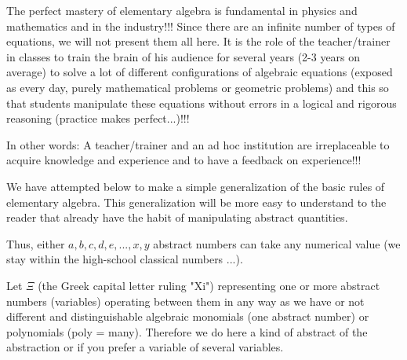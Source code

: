 	The perfect mastery of elementary algebra is fundamental in physics and mathematics and in the industry!!! Since there are an infinite number of types of equations, we will not present them all here. It is the role of the teacher/trainer in classes to train the brain of his audience for several years (2-3 years on average) to solve a lot of different configurations of algebraic equations (exposed as every day, purely mathematical problems or geometric problems) and this so that students manipulate these equations without errors in a logical and rigorous reasoning (practice makes perfect...)!!!

	In other words: A teacher/trainer and an ad hoc institution are irreplaceable to acquire knowledge and experience and to have a feedback on experience!!!

	\begin{tcolorbox}[title=Remark,colframe=black,arc=10pt]
We have attempted below to make a simple generalization of the basic rules of elementary algebra. This generalization will be more easy to understand to the reader that already have the habit of manipulating abstract quantities.
	\end{tcolorbox}	

	Thus, either $a, b, c, d, e, ..., x, y$ abstract numbers can take any numerical value (we stay within the high-school classical numbers ...).

	Let $\Xi$ (the Greek capital letter ruling "Xi") representing one or more abstract numbers (variables) operating between them in any way as we have or not different and distinguishable algebraic monomials (one abstract number) or polynomials (poly = many). Therefore we do here a kind of abstract of the abstraction or if you prefer a variable of several variables.

